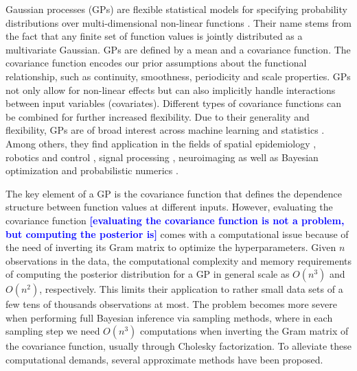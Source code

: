 \documentclass[onecolumn,a4paper,11pt]{article}
\newcommand{\todo}[1]{\textcolor{blue}{\textbf{[#1]}}}
\begin{document}
Gaussian processes (GPs) are flexible statistical models for specifying probability distributions over multi-dimensional non-linear functions \citep{rasmussen2006gaussian,neal1997monte}. Their name stems from the fact that any finite set of function values is jointly distributed as a multivariate Gaussian. GPs are defined by a mean and a covariance function. The covariance function encodes our prior assumptions about the functional relationship, such as continuity, smoothness, periodicity and scale properties. GPs not only allow for non-linear effects but can also implicitly handle interactions between input variables (covariates). Different types of covariance functions can be combined for further increased flexibility. Due to their generality and flexibility, GPs are of broad interest across machine learning and statistics \citep{rasmussen2006gaussian,neal1997monte}. Among others, they find application in the fields of spatial epidemiology \citep{diggle2013statistical,carlin2014hierarchical}, robotics and control \citep{deisenroth2015gaussian}, signal processing \citep{sarkka2013spatiotemporal}, neuroimaging \citep{andersen2017} as well as Bayesian optimization and probabilistic numerics \citep{roberts2010bayesian,briol2015probabilistic,hennig2015probabilistic}.

The key element of a GP is the covariance function that defines the dependence structure between function values at different inputs. However, evaluating the covariance function \todo{evaluating the covariance function is not a problem, but computing the posterior is} comes with a computational issue because of the need of inverting its Gram matrix to optimize the hyperparameters. Given $n$ observations in the data, the computational complexity and memory requirements of computing the posterior distribution for a GP in general scale as $O(n^3)$ and $O(n^2)$, respectively. This limits their application to rather small data sets of a few tens of thousands observations at most. The problem becomes more severe when performing full Bayesian inference via sampling methods, where in each sampling step we need $O(n^3)$ computations when inverting the Gram matrix of the covariance function, usually through Cholesky factorization. To alleviate these computational demands, several approximate methods have been proposed. 
\end{document}
